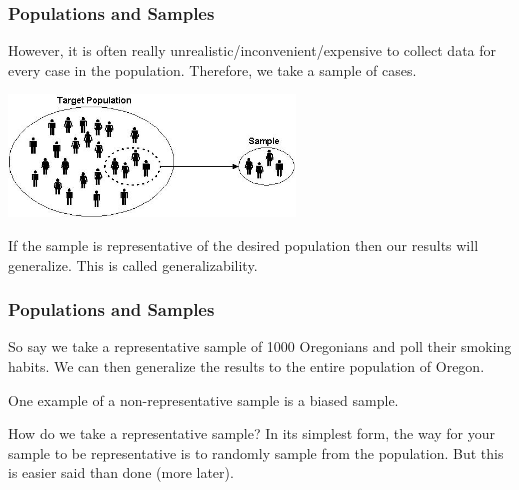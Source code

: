 \documentclass[handout]{beamer}
\newcommand{\blue}[1]{\textcolor{blue2}{#1}}
\begin{document}
\begin{frame}
\frametitle{Populations and Samples}

However, it is often really unrealistic/inconvenient/expensive to collect data for every case in the population.  Therefore, we take a \blue{sample} of cases.

\begin{center}
\pause\includegraphics[width=3in]{./figure/target-population.jpg} 
\end{center}


\pause If the sample is representative of the desired population then our results will generalize. This is called \blue{generalizability}.  

\end{frame}




\begin{frame}
\frametitle{Populations and Samples}
So say we take a representative sample of 1000 Oregonians and poll their smoking habits.  We can then generalize the results to the \blue{entire} population of Oregon.

\vspace{0.5cm}

\pause One example of a non-representative sample is a \blue{biased sample}.

\vspace{0.5cm}

\pause \blue{How do we take a representative sample}?  In its simplest form, the way for your sample to be representative is to \blue{randomly} sample from the population.  But this is easier said than done (more later).



\end{frame}
\end{document}
